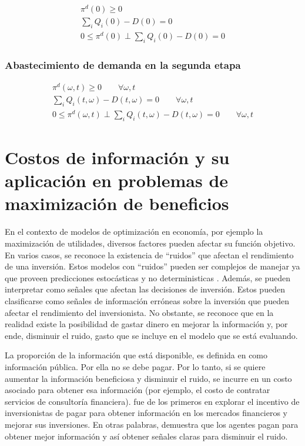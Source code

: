 \begin{footnotesize}
\begin{align}
 \pi^d(0) \geq 0 \\
 \sum_{i}Q_i(0) - D(0) = 0\\
0 \leq \pi^d(0) \perp \sum_{i}Q_i(0) - D(0)= 0
\end{align}
\end{footnotesize}


\subsubsection{Abastecimiento de demanda en la segunda etapa}

\begin{footnotesize}
\begin{align}
 \pi^d(\omega,t) \geq 0 \qquad \forall \omega,t\\
 \sum_{i}Q_i(t,\omega) - D(t,\omega) = 0 \qquad \forall \omega,t\\
 0 \leq \pi^d(\omega,t) \perp \sum_{i}Q_i(t,\omega) - D(t,\omega) = 0 \qquad \forall \omega,t
\end{align}
\end{footnotesize}




\section{Costos de información y su aplicación en problemas de maximización de beneficios}\label{marco:costos}

En el contexto de modelos de optimización en economía, por ejemplo la maximización de utilidades, diversos factores pueden afectar su función objetivo. En varios casos, se reconoce la existencia de ``ruidos'' que afectan el rendimiento de una inversión. Estos modelos con ``ruidos'' pueden ser complejos de manejar ya que proveen predicciones estocásticas y no deterministicas . Además, se pueden interpretar como señales que afectan las decisiones de inversión. Estos pueden clasificarse como señales de información erróneas sobre la inversión que pueden afectar el rendimiento del inversionista. No obstante, se reconoce que en la realidad existe la posibilidad de gastar dinero en mejorar la información y, por ende, disminuir el ruido, gasto que se incluye en el modelo que se está evaluando.
\vspace{2.5mm}

La proporción de la información que está disponible, es definida en como información pública. Por ella no se debe pagar. Por lo tanto, si se quiere aumentar la información beneficiosa y disminuir el ruido, se incurre en un costo asociado para obtener esa información (por ejemplo, el costo de contratar servicios de consultoría financiera).  fue de los primeros en explorar el incentivo de inversionistas de pagar para obtener información en los mercados financieros y mejorar sus inversiones. En otras palabras, demuestra que los agentes pagan para obtener mejor información y así obtener señales claras para disminuir el ruido. 
\vspace{2.5mm}

